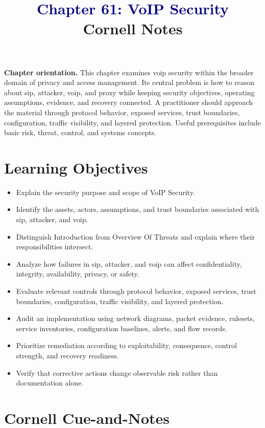 \documentclass[11pt]{article}
\title{\textcolor{Navy}{Chapter 61: VoIP Security}\\[2mm]\large Cornell Notes}
\author{}
\date{}
\begin{document}
\maketitle
\thispagestyle{fancy}
\vspace{-1.5em}
\begin{orientationbox}
\textbf{Chapter orientation.} This chapter examines voip security within the broader domain of privacy and access management. Its central problem is how to reason about sip, attacker, voip, and proxy while keeping security objectives, operating assumptions, evidence, and recovery connected. A practitioner should approach the material through protocol behavior, exposed services, trust boundaries, configuration, traffic visibility, and layered protection. Useful prerequisites include basic risk, threat, control, and systems concepts.
\end{orientationbox}
\section*{Learning Objectives}
\begin{itemize}
\item Explain the security purpose and scope of VoIP Security.
\item Identify the assets, actors, assumptions, and trust boundaries associated with sip, attacker, and voip.
\item Distinguish Introduction from Overview Of Threats and explain where their responsibilities intersect.
\item Analyze how failures in sip, attacker, and voip can affect confidentiality, integrity, availability, privacy, or safety.
\item Evaluate relevant controls through protocol behavior, exposed services, trust boundaries, configuration, traffic visibility, and layered protection.
\item Audit an implementation using network diagrams, packet evidence, rulesets, service inventories, configuration baselines, alerts, and flow records.
\item Prioritize remediation according to exploitability, consequence, control strength, and recovery readiness.
\item Verify that corrective actions change observable risk rather than documentation alone.
\end{itemize}
\section*{Cornell Cue-and-Notes}
\end{document}
